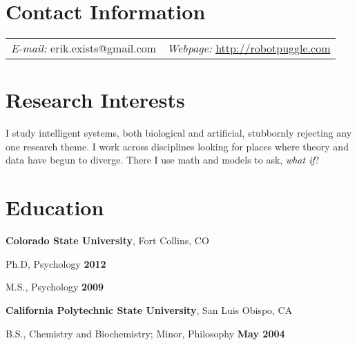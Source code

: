 \documentclass[margin,line]{res}
\newenvironment{list1}{
  \begin{list}{\ding{113}}{%
      \setlength{\itemsep}{0in}
      \setlength{\parsep}{0in} \setlength{\parskip}{0in}
      \setlength{\topsep}{0in} \setlength{\partopsep}{0in}
      \setlength{\leftmargin}{0.17in}}}{\end{list}}
\begin{document}
\newcommand{\link}[1]{\texttt{#1}}
\providecommand{\tightlist}{%
      \setlength{\itemsep}{0pt}\setlength{\parskip}{0pt}}



\begin{resume}
\section{\sc Contact Information}
\vspace{.05in}
\begin{tabular}{@{}p{2in}p{4in}}
{\it E-mail:}  erik.exists@gmail.com   & {\it Webpage:} \href{http://robotpuggle.com}{http://robotpuggle.com} \\
\end{tabular}


\section{\sc Research Interests}
I study intelligent systems, both biological and artificial, stubbornly rejecting any one research theme. I work across disciplines looking for places where theory and data have begun to diverge. There I use math and models to ask, \textit{what if}?


\section{\sc Education}
{\bf Colorado State University}, Fort Collins, CO\\
\vspace*{-.1in}
\begin{list1}
\item[] Ph.D, Psychology \hfill {\bf 2012}
\item[] M.S., Psychology \hfill {\bf 2009}
\end{list1}

{\bf California Polytechnic State University}, San Luis Obispo, CA\\
\vspace*{-.1in}
\begin{list1}
\item[] B.S., Chemistry and Biochemistry; Minor, Philosophy \hfill {\bf May 2004}
\end{list1}



\end{resume}
\end{document}
